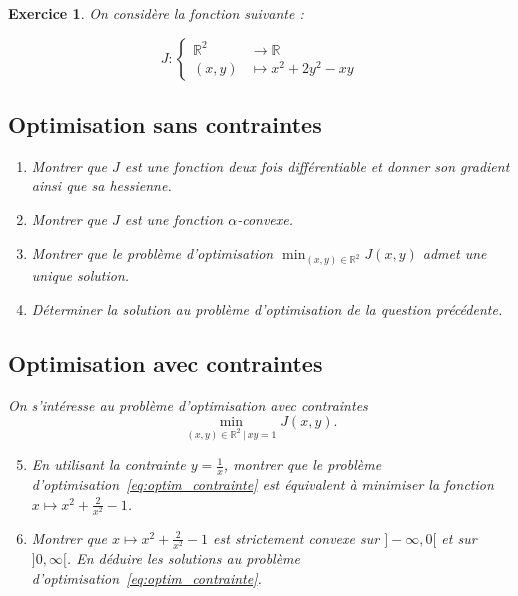 \documentclass[11pt]{article}
\theoremstyle{exostyle}
\newtheorem{exercice}{Exercice}
\begin{document}
\begin{exercice}

  On considère la fonction suivante :

  \[
    J:\left\{\begin{aligned}
        \mathbb{R}^{2} & \rightarrow \mathbb{R} \\
        (x, y) & \mapsto x^{2}+2 y^{2}-xy
      \end{aligned}\right.
  \]

  \subsection*{Optimisation sans contraintes}
  
  \begin{enumerate}
  \item Montrer que $J$ est une fonction deux fois différentiable et donner son gradient ainsi que sa hessienne.
    
  \item Montrer que $J$ est une fonction $\alpha$-convexe.
    
  \item Montrer que le problème d’optimisation $\min_{(x,y) \in \mathbb{R}^2} J(x,y)$ admet une unique solution.
    
  \item Déterminer la solution au problème d’optimisation de la question précédente.
  \end{enumerate}
  
  \subsection*{Optimisation avec contraintes}

  On s’intéresse au problème d’optimisation avec contraintes 
  \begin{equation}
    \label{eq:optim_contrainte}
    \min_{(x,y) \in \mathbb{R}^2 \ | \ xy=1} J(x,y).
  \end{equation}

  \begin{enumerate}
    \setcounter{enumi}{4}
  \item En utilisant la contrainte $y= \frac{1}{x}$, montrer que le problème d’optimisation~\eqref{eq:optim_contrainte} est équivalent à minimiser la fonction $x \mapsto x^2 + \frac{2}{x^2}-1$. 

  \item Montrer que $x \mapsto x^2 + \frac{2}{x^2}-1$ est strictement convexe sur $]-\infty,0[$ et sur $]0,\infty[$. En déduire les solutions au problème d’optimisation~\eqref{eq:optim_contrainte}.


\end{enumerate}
\end{exercice}
\end{document}
